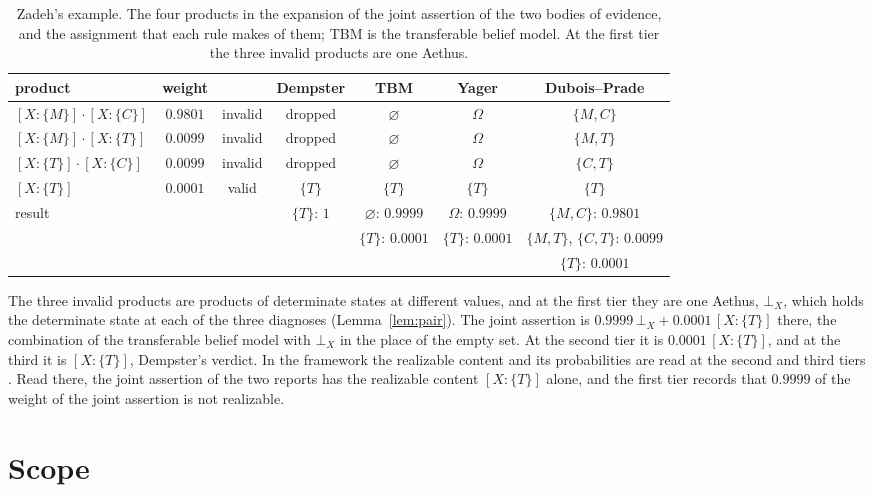\begin{table}[ht]
\centering\small
\setlength{\tabcolsep}{4pt}
\begin{tabular}{@{}lcccccc@{}}
\toprule
product & weight & & Dempster & TBM & Yager & Dubois--Prade\\
\midrule
$[X:\{M\}]\cdot[X:\{C\}]$ & $0.9801$ & invalid & dropped & $\varnothing$ & $\Omega$ & $\{M, C\}$\\
$[X:\{M\}]\cdot[X:\{T\}]$ & $0.0099$ & invalid & dropped & $\varnothing$ & $\Omega$ & $\{M, T\}$\\
$[X:\{T\}]\cdot[X:\{C\}]$ & $0.0099$ & invalid & dropped & $\varnothing$ & $\Omega$ & $\{C, T\}$\\
$[X:\{T\}]$ & $0.0001$ & valid & $\{T\}$ & $\{T\}$ & $\{T\}$ & $\{T\}$\\
\midrule
result & & & $\{T\}$: $1$ & $\varnothing$: $0.9999$ & $\Omega$: $0.9999$ & $\{M,C\}$: $0.9801$\\
 & & & & $\{T\}$: $0.0001$ & $\{T\}$: $0.0001$ & $\{M,T\}$, $\{C,T\}$: $0.0099$\\
 & & & & & & $\{T\}$: $0.0001$\\
\bottomrule
\end{tabular}
\caption{\small Zadeh's example. The four products in the expansion of the joint assertion of the two bodies of evidence, and the assignment that each rule makes of them; TBM is the transferable belief model. At the first tier the three invalid products are one Aethus.}
\label{tab:zadeh}
\end{table}

The three invalid products are products of determinate states at different values, and at the first tier they are one Aethus, $\bot_X$, which holds the determinate state at each of the three diagnoses (Lemma~\ref{lem:pair}). The joint assertion is $0.9999\,\bot_X + 0.0001\,[X:\{T\}]$ there, the combination of the transferable belief model with $\bot_X$ in the place of the empty set. At the second tier it is $0.0001\,[X:\{T\}]$, and at the third it is $[X:\{T\}]$, Dempster's verdict. In the framework the realizable content and its probabilities are read at the second and third tiers \cite{Aethus}. Read there, the joint assertion of the two reports has the realizable content $[X:\{T\}]$ alone, and the first tier records that $0.9999$ of the weight of the joint assertion is not realizable.

\section{Scope}\label{sec:scope}


